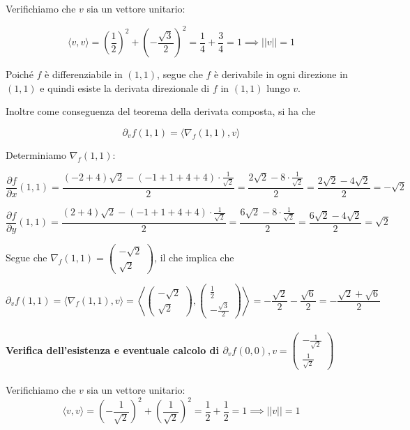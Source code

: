 \documentclass{article}
\begin{document}
Verifichiamo che \(v\) sia un vettore unitario:

\[
\langle v, v \rangle = \left(\frac{1}{2}\right)^2 + \left(-\frac{\sqrt{3}}{2}\right)^2 = \frac{1}{4} + \frac{3}{4} = 1 \implies ||v|| = 1
\]

Poiché \(f\) è differenziabile in \((1,1)\), segue che \(f\) è derivabile in ogni direzione in \((1,1)\) e quindi esiste la derivata direzionale di \(f\) in \((1,1)\) lungo \(v\).

Inoltre come conseguenza del teorema della derivata composta, si ha che 

\[
\partial_v f(1,1) = \langle \nabla_f(1,1), v \rangle
\]

Determiniamo \(\nabla_f(1,1)\):

\[
\frac{\partial f}{\partial x}(1,1) =  \frac{(-2+4)\sqrt{2} - (-1 + 1 + 4 + 4)\cdot \frac{1}{\sqrt{2}}}{2} = \frac{2\sqrt{2} - 8\cdot \frac{1}{\sqrt{2}}}{2} = \frac{2\sqrt{2} - 4\sqrt{2}}{2} = -\sqrt{2}
\]

\[
\frac{\partial f}{\partial y}(1,1) =  \frac{(2+4)\sqrt{2} - (-1 + 1 + 4 + 4)\cdot \frac{1}{\sqrt{2}}}{2} = \frac{6\sqrt{2} - 8\cdot \frac{1}{\sqrt{2}}}{2} = \frac{6\sqrt{2} - 4\sqrt{2}}{2} = \sqrt{2}
\]


Segue che \(\nabla_f(1,1) = \begin{pmatrix} -\sqrt{2} \\ \sqrt{2} \end{pmatrix}\), il che implica che

\[
\partial_v f(1,1) = \langle \nabla_f(1,1), v \rangle = \left\langle \begin{pmatrix} -\sqrt{2} \\ \sqrt{2} \end{pmatrix}, \begin{pmatrix} \frac{1}{2} \\ -\frac{\sqrt{3}}{2}\end{pmatrix} \right\rangle = -\frac{\sqrt{2}}{2} - \frac{\sqrt{6}}{2} = -\frac{\sqrt{2} + \sqrt{6}}{2}
\]

\paragraph{Verifica dell'esistenza e eventuale calcolo di \(\partial_v f(0,0), v = \begin{pmatrix} -\frac{1}{\sqrt{2}} \\ \frac{1}{\sqrt{2}}\end{pmatrix}\)}

Verifichiamo che \(v\) sia un vettore unitario:
\[
\langle v, v \rangle = \left(-\frac{1}{\sqrt{2}}\right)^2 + \left(\frac{1}{\sqrt{2}}\right)^2 = \frac{1}{2} + \frac{1}{2} = 1 \implies ||v|| = 1
\]
\end{document}
